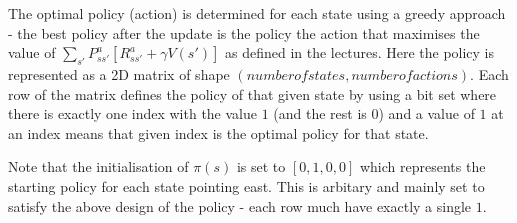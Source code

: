 \documentclass[12pt,a4paper]{report}
\begin{document}
The optimal policy (action) is determined for each state using a greedy
approach - the best policy after the update is the policy the action
that maximises the value of 
$\sum_{s'} P^a_{ss'}[R^a_{ss'} + \gamma V(s')]$ as defined in the lectures.
Here the policy is represented as a 2D matrix of shape 
$(number of states, number of actions)$. Each row of the matrix 
defines the policy of that given state by using a bit set where there 
is exactly one index with the value $1$ (and the rest is $0$) 
and a value of $1$ at an index means that given index is the optimal
policy for that state. 

Note that the initialisation of $\pi(s)$ is set to $[0,1,0,0]$ which 
represents the starting policy for each state pointing east.
This is arbitary and mainly set to satisfy the above design of the 
policy - each row much have exactly a single $1$. 

\end{document}
